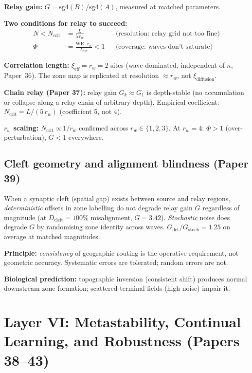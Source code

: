 \documentclass[11pt]{article}
\begin{document}
\textbf{Relay gain:}
$G = \mathrm{sg4}(B) / \mathrm{sg4}(A)$, measured at matched parameters.

\textbf{Two conditions for relay to succeed:}
\begin{align}
N < N_\mathrm{crit} &= \frac{L}{5\,r_w} && \text{(resolution: relay grid not too fine)} \\
\Phi &= \frac{\mathrm{WR} \cdot r_w}{T_\mathrm{dur}} < 1 && \text{(coverage: waves don't saturate)}
\end{align}

\textbf{Correlation length:} $\xi_\mathrm{eff} = r_w = 2$ sites (wave-dominated, independent
of $\kappa$, Paper~36). The zone map is replicated at resolution $\approx r_w$, not $\xi_\mathrm{diffusion}$.

\textbf{Chain relay (Paper 37):} relay gain $G_k \approx G_1$ is depth-stable
(no accumulation or collapse along a relay chain of arbitrary depth).
Empirical coefficient: $N_\mathrm{crit} = L/(5\,r_w)$ (coefficient 5, not 4).

\textbf{$r_w$ scaling:} $N_\mathrm{crit} \propto 1/r_w$ confirmed across $r_w \in \{1,2,3\}$.
At $r_w = 4$: $\Phi > 1$ (over-perturbation), $G < 1$ everywhere.

\subsection{Cleft geometry and alignment blindness (Paper 39)}

When a synaptic cleft (spatial gap) exists between source and relay regions,
\emph{deterministic} offsets in zone labelling do not degrade relay gain $G$
regardless of magnitude (at $D_\mathrm{cleft} = 100\%$ misalignment, $G = 3.42$).
\emph{Stochastic} noise does degrade $G$ by randomising zone identity across waves.
$G_\mathrm{det}/G_\mathrm{stoch} = 1.25$ on average at matched magnitudes.

\textbf{Principle:} \emph{consistency} of geographic routing is the operative
requirement, not geometric accuracy.
Systematic errors are tolerated; random errors are not.

\textbf{Biological prediction:} topographic inversion (consistent shift) produces
normal downstream zone formation; scattered terminal fields (high noise) impair it.

\section{Layer VI: Metastability, Continual Learning, and Robustness (Papers 38--43)}
\end{document}

